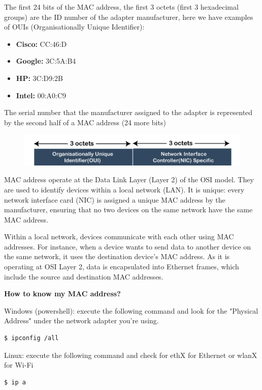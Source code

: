 \documentclass{article}
\newenvironment{codetemplate}[1][]{%
  \mybasecolorbox[#1]
  \itshape
}{%
  \endmybasecolorbox
}
\begin{document}
The first 24 bits of the MAC address, the first 3 octets (first 3 hexadecimal groups) are the ID number of the adapter manufacturer, here we have examples of OUIs (Organisationally Unique Identifier):

\begin{itemize}
    \item \textbf{Cisco:} CC:46:D
    \item \textbf{Google:} 3C:5A:B4 
    \item \textbf{HP:} 3C:D9:2B
    \item \textbf{Intel:} 00:A0:C9
\end{itemize}

The serial number that the manufacturer assigned to the adapter is represented by the second half of a MAC address (24 more bits)

\begin{figure}[H]
    \includegraphics[width=\textwidth]{pictures/mac.png}
    \centering
\end{figure}

MAC address  operate at the Data Link Layer (Layer 2) of the OSI model. They are used to identify devices within a local network (LAN). It is unique: every network interface card (NIC) is assigned a unique MAC address by the manufacturer, ensuring that no two devices on the same network have the same MAC address.

Within a local network, devices communicate with each other using MAC addresses. For instance, when a device wants to send data to another device on the same network, it uses the destination device's MAC address. As it is operating at OSI Layer 2, data is encapsulated into Ethernet frames, which include the source and destination MAC addresses.

\textbf{How to know my MAC address?}


Windows (powershell): execute the following command and look for the "Physical Address" under the network adapter you're using. 
\begin{codetemplate}{}
\begin{verbatim}
$ ipconfig /all
\end{verbatim}
\end{codetemplate}

Linux: execute the following command and check for ethX for Ethernet or wlanX for Wi-Fi
\begin{codetemplate}{}
\begin{verbatim}
$ ip a
\end{verbatim}
\end{codetemplate}
\end{document}
